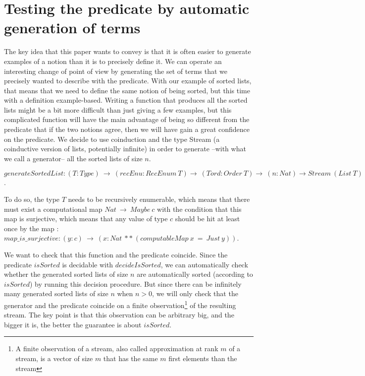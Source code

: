 \section{Testing the predicate by automatic generation of terms}

\label{sect:testingInside}

The key idea that this paper wants to convey is that it is often easier to generate examples of a notion than it is to precisely define it. We can operate an interesting change of point of view by generating the set of terms that we precisely wanted to describe with the predicate. With our example of sorted lists, that means that we need to define the same notion of being sorted, but this time with a definition example-based. Writing a function that produces all the sorted lists might be a bit more difficult than just giving a few examples, but this complicated function will have the main advantage of being so different from the predicate that if the two notions agree, then we will have gain a great confidence on the predicate. We decide to use coinduction and the type Stream (a coinductive version of lists, potentially infinite) in order to generate --with what we call a generator-- all the sorted lists of size $n$.

$generateSortedList : (T:Type)\ \rightarrow\ (recEnu:RecEnum\ T) \rightarrow\ (Tord : Order\ T) \rightarrow\ (n:Nat) \rightarrow Stream\ (List\ T)$.

To do so, the type $T$ needs to be recursively enumerable, which means that there must exist a computational map $Nat\ \rightarrow\ Maybe\ c$ with the condition that this map is surjective, which means that any value of type $c$ should be hit at least once by the map : $map\_is\_surjective : (y:c)\ \rightarrow\ (x:Nat\ **\ (computableMap\ x\ =\ Just\ y))$.

We want to check that this function and the predicate coincide. Since the predicate $isSorted$ is decidable with $decideIsSorted$, we can automatically check whether the generated sorted lists of size $n$ are automatically sorted (according to $isSorted$) by running this decision procedure. But since there can be infinitely many generated sorted lists of size $n$ when $n > 0$, we will only check that the generator and the predicate coincide on a finite observation\footnote{A finite observation of a stream, also called approximation at rank $m$ of a stream, is a vector of size $m$ that has the same $m$ first elements than the stream} of the resulting stream. The key point is that this observation can be arbitrary big, and the bigger it is, the better the guarantee is about $isSorted$.

